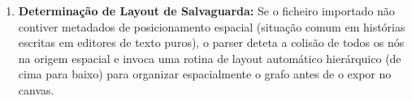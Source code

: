 \begin{enumerate}
\begin{itemize}
        \item \textbf{Ligações Condicionais e de Desvio:} Comandos lógicos e macros de controlo que encapsulam hiperligações ou transições forçadas de estado. O parser analisa a estrutura sintática para registar a aresta correspondente no modelo de dados do grafo.
    \end{itemize}
    Caso o nó de destino mapeado em qualquer ligação não corresponda a um nó válido na história, o parser emite um aviso de inconsistência estrutural (link quebrado) a ser sinalizado graficamente no editor.
    
    \item \textbf{Determinação de Layout de Salvaguarda:} Se o ficheiro importado não contiver metadados de posicionamento espacial (situação comum em histórias escritas em editores de texto puros), o parser deteta a colisão de todos os nós na origem espacial e invoca uma rotina de layout automático hierárquico (de cima para baixo) para organizar espacialmente o grafo antes de o expor no canvas.
\end{enumerate}

